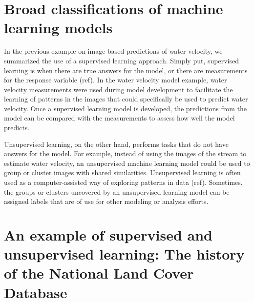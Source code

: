 \documentclass[
]{book}
\begin{document}
\hypertarget{broad-classifications-of-machine-learning-models}{%
\section{Broad classifications of machine learning models}\label{broad-classifications-of-machine-learning-models}}

In the previous example on image-based predictions of water velocity, we summarized the use of a supervised learning approach. Simply put, supervised learning is when there are true answers for the model, or there are measurements for the response variable (ref). In the water velocity model example, water velocity measurements were used during model development to facilitate the learning of patterns in the images that could specifically be used to predict water velocity. Once a supervised learning model is developed, the predictions from the model can be compared with the measurements to assess how well the model predicts.

Unsupervised learning, on the other hand, performs tasks that do not have answers for the model. For example, instead of using the images of the stream to estimate water velocity, an unsupervised machine learning model could be used to group or cluster images with shared similarities. Unsupervised learning is often used as a computer-assisted way of exploring patterns in data (ref). Sometimes, the groups or clusters uncovered by an unsupervised learning model can be assigned labels that are of use for other modeling or analysis efforts.

\hypertarget{an-example-of-supervised-and-unsupervised-learning-the-history-of-the-national-land-cover-database}{%
\section{An example of supervised and unsupervised learning: The history of the National Land Cover Database}\label{an-example-of-supervised-and-unsupervised-learning-the-history-of-the-national-land-cover-database}}
\end{document}

